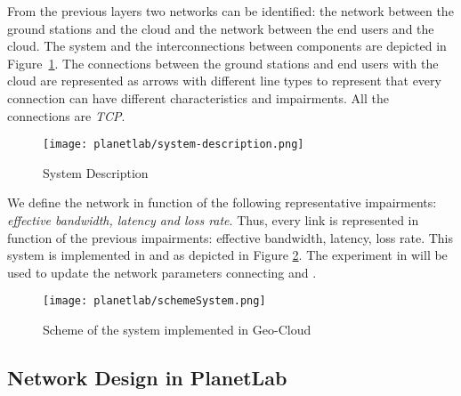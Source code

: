 From the previous layers two networks can be identified: the network between the
ground stations and the cloud and the network between the end users and the
cloud. The system and the interconnections between components are depicted in
Figure~\ref{fig:ple-system-description}. The connections between the ground stations and end users with the
cloud are represented as arrows with different line types to represent that
every connection can have different characteristics and impairments. All the
connections are \emph{TCP}.

\begin{figure}[!h]
\begin{center}
\texttt{[image: planetlab/system-description.png]}

\caption{System Description}
\label{fig:ple-system-description}
\end{center}
\end{figure}

We define the network in function of the following representative impairments: \emph{effective bandwidth, latency and loss rate}. Thus, every link is represented in function of the previous impairments: effective bandwidth, latency, loss rate.
This system is implemented in \vw and \bonfire as depicted in Figure
\ref{fig:ple-scheme-system}. The experiment in \pl will be used to update the
network parameters connecting \vw and \bonfire.

\begin{figure}[!h]
\begin{center}
\texttt{[image: planetlab/schemeSystem.png]}
\caption{Scheme of the system implemented in Geo-Cloud}
\label{fig:ple-scheme-system}
\end{center}
\end{figure}


\subsection{Network Design in PlanetLab}

